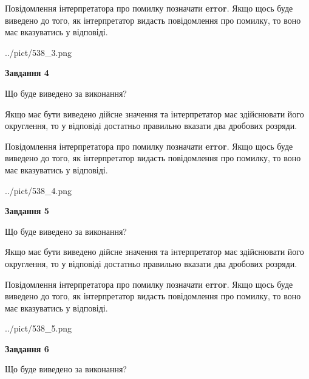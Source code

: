 \documentclass[12pt, ukrainian]{article}
\begin{document}
{\begin {Large}
Повідомлення інтерпретатора про помилку позначати \textbf{error}.
Якщо щось буде виведено до того, як інтерпретатор видасть повідомлення про помилку, 
то воно має вказуватись у відповіді. \par

\begin{center}
	{../pict/538_3.png}
\end{center}
\newpage

{\begin {center}\textbf{Завдання 4}\end {center}}\par
Що буде виведено за виконання? \par

Якщо має бути виведено дійсне значення та інтерпретатор має здійснювати його округлення, 
то у відповіді достатньо правильно вказати два дробових розряди.

Повідомлення інтерпретатора про помилку позначати \textbf{error}.
Якщо щось буде виведено до того, як інтерпретатор видасть повідомлення про помилку, 
то воно має вказуватись у відповіді. \par

\begin{center}
	{../pict/538_4.png}
\end{center}
\newpage

{\begin {center}\textbf{Завдання 5}\end {center}}\par
Що буде виведено за виконання? \par

Якщо має бути виведено дійсне значення та інтерпретатор має здійснювати його округлення, 
то у відповіді достатньо правильно вказати два дробових розряди.

Повідомлення інтерпретатора про помилку позначати \textbf{error}.
Якщо щось буде виведено до того, як інтерпретатор видасть повідомлення про помилку, 
то воно має вказуватись у відповіді. \par

\begin{center}
	{../pict/538_5.png}
\end{center}
\newpage

{\begin {center}\textbf{Завдання 6}\end {center}}\par
Що буде виведено за виконання? \par


\end{Large}}
\end{document}
